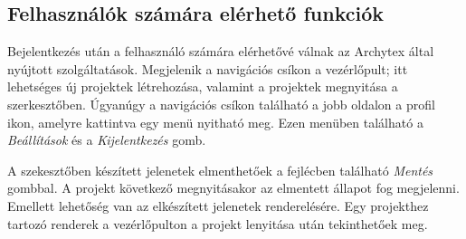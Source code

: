 \subsection{Felhasználók számára elérhető funkciók}
Bejelentkezés után a felhasználó számára elérhetővé válnak az Archytex által nyújtott szolgáltatások. Megjelenik a navigációs csíkon a vezérlőpult; itt lehetséges új projektek létrehozása, valamint a projektek megnyitása a szerkesztőben. Úgyanúgy a navigációs csíkon található a jobb oldalon a profil ikon, amelyre kattintva egy menü nyitható meg. Ezen menüben található a \emph{Beállítások} és a \emph{Kijelentkezés} gomb.

A szekesztőben készített jelenetek elmenthetőek a fejlécben található \emph{Mentés} gombbal. A projekt következő megnyitásakor az elmentett állapot fog megjelenni. Emellett lehetőség van az elkészített jelenetek renderelésére. Egy projekthez tartozó renderek a vezérlőpulton a projekt lenyitása után tekinthetőek meg.